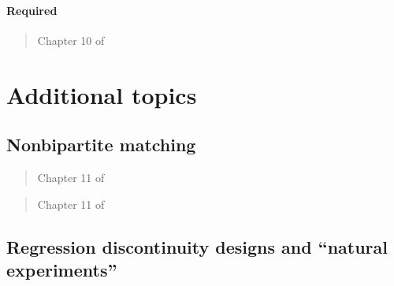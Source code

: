 \documentclass[12pt]{article}
\begin{document}
\paragraph*{Required}

\begin{verse}  \end{verse}

\begin{verse} Chapter 10 of  \end{verse}

\section{Additional topics}

\subsection{Nonbipartite matching}\label{sec:nbp}

\begin{verse} Chapter 11 of  \end{verse}

\begin{verse}  \end{verse}

\begin{verse} Chapter 11 of  \end{verse}

\begin{verse}  \end{verse}

\begin{verse}  \end{verse}

\begin{verse}  \end{verse}

\begin{verse}  \end{verse}
\begin{verse}  \end{verse}

\subsection{Regression discontinuity designs and ``natural experiments''} \label{sec:nat_exp}
\end{document}
